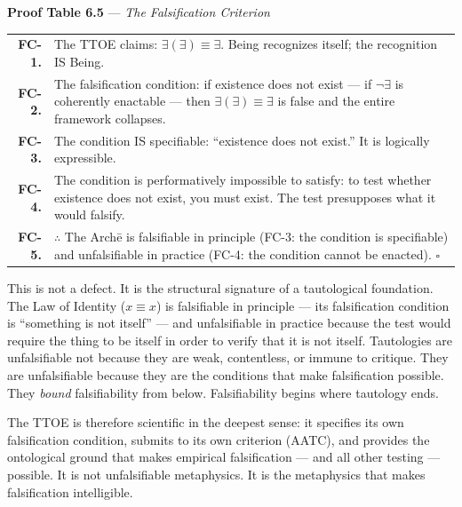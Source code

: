 \documentclass[10pt, openany, oneside]{book}
\renewcommand{\footnotesize}{\fontsize{8.5}{11}\selectfont}
\begin{document}
\vspace{0.5em}

\textbf{Proof Table 6.5} --- \textit{The Falsification Criterion}

\vspace{0.5em}

{\footnotesize
\noindent\begin{tabular}{r p{}}
\textbf{FC-1.} & The TTOE claims: $\exists(\exists) \equiv \exists$. Being recognizes itself; the recognition IS Being. \\[0.3em]
\textbf{FC-2.} & The falsification condition: if existence does not exist --- if $\neg\exists$ is coherently enactable --- then $\exists(\exists) \equiv \exists$ is false and the entire framework collapses. \\[0.3em]
\textbf{FC-3.} & The condition IS specifiable: ``existence does not exist.'' It is logically expressible. \\[0.3em]
\textbf{FC-4.} & The condition is performatively impossible to satisfy: to test whether existence does not exist, you must exist. The test presupposes what it would falsify. \\[0.3em]
\textbf{FC-5.} & $\therefore$ The Arch\={e} is falsifiable in principle (FC-3: the condition is specifiable) and unfalsifiable in practice (FC-4: the condition cannot be enacted). $\square$ \\[0.3em]
\end{tabular}
}

\vspace{0.8em}

\noindent This is not a defect. It is the structural signature of a tautological foundation. The Law of Identity ($x \equiv x$) is falsifiable in principle --- its falsification condition is ``something is not itself'' --- and unfalsifiable in practice because the test would require the thing to be itself in order to verify that it is not itself. Tautologies are unfalsifiable not because they are weak, contentless, or immune to critique. They are unfalsifiable because they are the conditions that make falsification possible. They \textit{bound} falsifiability from below. Falsifiability begins where tautology ends.

The TTOE is therefore scientific in the deepest sense: it specifies its own falsification condition, submits to its own criterion (AATC), and provides the ontological ground that makes empirical falsification --- and all other testing --- possible. It is not unfalsifiable metaphysics. It is the metaphysics that makes falsification intelligible.
\end{document}

